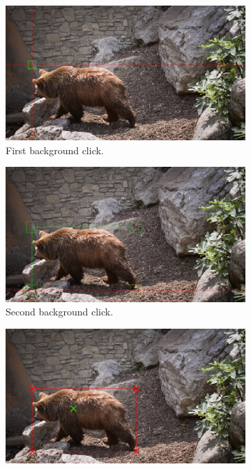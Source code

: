 \begin{figure}
	\centering
	\begin{subfigure}[b]{0.3\textwidth}
		\centering
		\includegraphics[width=\textwidth]{figures/chap34_bear_2.png}
		\caption{First background click.}
		\label{fig:ch3:sec4:iog_workflow_1}
	\end{subfigure}
	\hfill
	\begin{subfigure}[b]{0.3\textwidth}
		\centering
		\includegraphics[width=\textwidth]{figures/chap34_bear_3.png}
		\caption{Second background click.}
		\label{fig:ch3:sec4:iog_workflow_2}
	\end{subfigure}
	\hfill
	\begin{subfigure}[b]{0.3\textwidth}
		\centering
		\includegraphics[width=\textwidth]{figures/chap34_bear_5.png}

\end{subfigure}
\end{figure}
